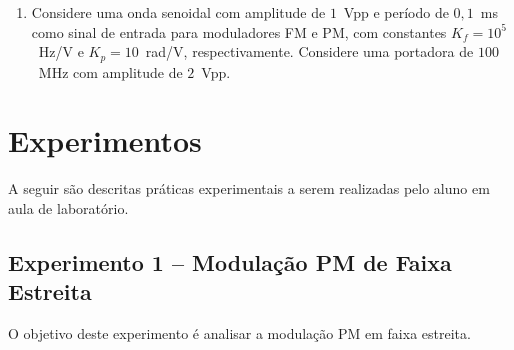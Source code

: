 \documentclass[12pt,addpoints]{exam}
\begin{document}
\begin{enumerate}
    \item Considere uma onda senoidal com amplitude de $1$~Vpp e período de $0,1$~ms como sinal de entrada para moduladores FM e PM, com constantes $K_f = 10^5$~Hz/V e $K_{p} = 10$~rad/V, respectivamente. Considere uma portadora de $100$~MHz com amplitude de $2$~Vpp.
\end{enumerate}

\section{Experimentos}

A seguir são descritas práticas experimentais a serem realizadas pelo aluno em aula de laboratório. 

\subsection{Experimento 1 -- Modulação PM de Faixa Estreita}

O objetivo deste experimento é analisar a modulação PM em faixa estreita.
\end{document}
